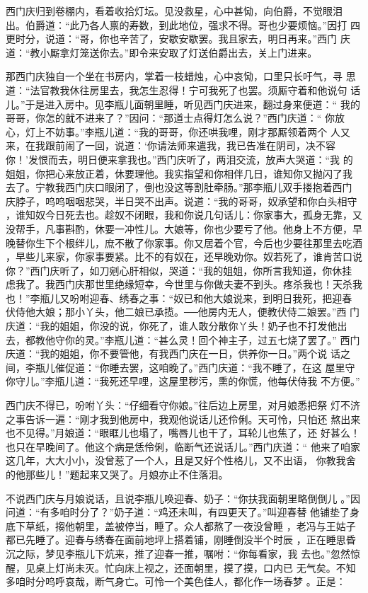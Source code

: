 西门庆归到卷棚内，看着收拾灯坛。见没救星，心中甚恸，向伯爵，不觉眼泪
出。伯爵道：“此乃各人禀的寿数，到此地位，强求不得。哥也少要烦恼。”因打
四更时分，说道：“哥，你也辛苦了，安歇安歇罢。我且家去，明日再来。”西门
庆道：“教小厮拿灯笼送你去。”即令来安取了灯送伯爵出去，关上门进来。

那西门庆独自一个坐在书房内，掌着一枝蜡烛，心中哀恸，口里只长吁气，寻
思道：“法官教我休往房里去，我怎生忍得！宁可我死了也罢。须厮守着和他说句
话儿。”于是进入房中。见李瓶儿面朝里睡，听见西门庆进来，翻过身来便道：“
我的哥哥，你怎的就不进来了？”因问：“那道士点得灯怎么说？”西门庆道：“
你放心，灯上不妨事。”李瓶儿道：“我的哥哥，你还哄我哩，刚才那厮领着两个
人又来，在我跟前闹了一回，说道：‘你请法师来遣我，我已告准在阴司，决不容
你！’发恨而去，明日便来拿我也。”西门庆听了，两泪交流，放声大哭道：“我
的姐姐，你把心来放正着，休要理他。我实指望和你相伴几日，谁知你又抛闪了我
去了。宁教我西门庆口眼闭了，倒也没这等割肚牵肠。”那李瓶儿双手搂抱着西门
庆脖子，呜呜咽咽悲哭，半日哭不出声。说道：“我的哥哥，奴承望和你白头相守
，谁知奴今日死去也。趁奴不闭眼，我和你说几句话儿：你家事大，孤身无靠，又
没帮手，凡事斟酌，休要一冲性儿。大娘等，你也少要亏了他。他身上不方便，早
晚替你生下个根绊儿，庶不散了你家事。你又居着个官，今后也少要往那里去吃酒
，早些儿来家，你家事要紧。比不的有奴在，还早晚劝你。奴若死了，谁肯苦口说
你？”西门庆听了，如刀剜心肝相似，哭道：“我的姐姐，你所言我知道，你休挂
虑我了。我西门庆那世里绝缘短幸，今世里与你做夫妻不到头。疼杀我也！天杀我
也！”李瓶儿又吩咐迎春、绣春之事：“奴已和他大娘说来，到明日我死，把迎春
伏侍他大娘；那小丫头，他二娘已承揽。──他房内无人，便教伏侍二娘罢。”西
门庆道：“我的姐姐，你没的说，你死了，谁人敢分散你丫头！奶子也不打发他出
去，都教他守你的灵。”李瓶儿道：“甚么灵！回个神主子，过五七烧了罢了。”
西门庆道：“我的姐姐，你不要管他，有我西门庆在一日，供养你一日。”两个说
话之间，李瓶儿催促道：“你睡去罢，这咱晚了。”西门庆道：“我不睡了，在这
屋里守你守儿。”李瓶儿道：“我死还早哩，这屋里秽污，熏的你慌，他每伏侍我
不方便。”

西门庆不得已，吩咐丫头：“仔细看守你娘。”往后边上房里，对月娘悉把祭
灯不济之事告诉一遍：“刚才我到他房中，我观他说话儿还伶俐。天可怜，只怕还
熬出来也不见得。”月娘道：“眼眶儿也塌了，嘴唇儿也干了，耳轮儿也焦了，还
好甚么！也只在早晚间了。他这个病是恁伶俐，临断气还说话儿。”西门庆道：“
他来了咱家这几年，大大小小，没曾惹了一个人，且是又好个性格儿，又不出语，
你教我舍的他那些儿！”题起来又哭了。月娘亦止不住落泪。

不说西门庆与月娘说话，且说李瓶儿唤迎春、奶子：“你扶我面朝里略倒倒儿
。”因问道：“有多咱时分了？”奶子道：“鸡还未叫，有四更天了。”叫迎春替
他铺垫了身底下草纸，搊他朝里，盖被停当，睡了。众人都熬了一夜没曾睡
，老冯与王姑子都已先睡了。迎春与绣春在面前地坪上搭着铺，刚睡倒没半个时辰
，正在睡思昏沉之际，梦见李瓶儿下炕来，推了迎春一推，嘱咐：“你每看家，我
去也。”忽然惊醒，见桌上灯尚未灭。忙向床上视之，还面朝里，摸了摸，口内已
无气矣。不知多咱时分呜呼哀哉，断气身亡。可怜一个美色佳人，都化作一场春梦
。正是：

